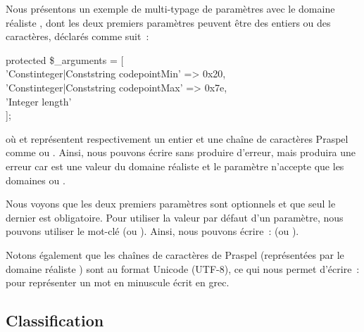\begin{example}

Nous présentons un exemple de multi-typage de paramètres avec le domaine
réaliste , dont les deux premiers paramètres peuvent être des
entiers ou des caractères, déclarés comme suit~:
%
\begin{pre}
protected \$_arguments = [ \\
    'Constinteger|Conststring codepointMin' => 0x20, \\
    'Constinteger|Conststring codepointMax' => 0x7e, \\
    'Integer                  length' \\
];
\end{pre}
%
où  et  représentent respectivement un
entier et une chaîne de caractères Praspel comme  ou .
Ainsi, nous pouvons écrire  sans produire
d'erreur, mais  produira une erreur car
 est une valeur du domaine réaliste  et le
paramètre  n'accepte que les domaines  ou
.

Nous voyons que les deux premiers paramètres sont optionnels et que seul le
dernier est obligatoire. Pour utiliser la valeur par défaut d'un paramètre, nous
pouvons utiliser le mot-clé  (ou ). Ainsi, nous pouvons
écrire~:  (ou ).

Notons également que les chaînes de caractères de Praspel (représentées par le
domaine réaliste ) sont au format Unicode (UTF-8), ce qui nous
permet d'écrire~:  pour représenter
un mot en minuscule écrit en grec.

\end{example}

\subsection{Classification}
\label{subsection:language:realdom:classification}

